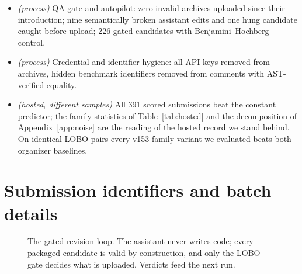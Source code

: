 \documentclass{article}
\begin{document}
\begin{itemize}
\item \emph{(process)} QA gate and autopilot: zero invalid archives uploaded since their introduction; nine semantically broken assistant edits and one hung candidate caught before upload; 226 gated candidates with Benjamini--Hochberg control.
\item \emph{(process)} Credential and identifier hygiene: all API keys removed from archives, hidden benchmark identifiers removed from comments with AST-verified equality.
\item \emph{(hosted, different samples)} All 391 scored submissions beat the constant predictor; the family statistics of Table~\ref{tab:hosted} and the decomposition of Appendix~\ref{app:noise} are the reading of the hosted record we stand behind. On identical LOBO pairs every v153-family variant we evaluated beats both organizer baselines.
\end{itemize}

\section{Submission identifiers and batch details}
\label{app:ids}
\begin{figure}[h]
\centering
{}
\caption{The gated revision loop. The assistant never writes code; every packaged candidate is valid by construction, and only the LOBO gate decides what is uploaded. Verdicts feed the next run.}
\label{fig:loop}
\end{figure}
\end{document}
